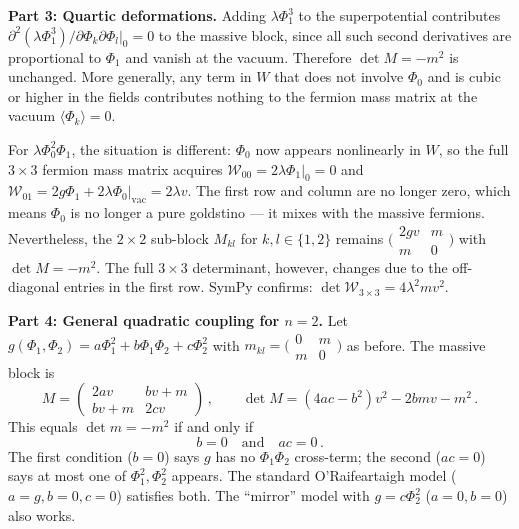\bigskip
\textbf{Part 3: Quartic deformations.}
Adding $\lambda\Phi_1^3$ to the superpotential contributes
$\partial^2(\lambda\Phi_1^3)/\partial\Phi_k\partial\Phi_l\big|_0 = 0$
to the massive block, since all such second derivatives are proportional to
$\Phi_1$ and vanish at the vacuum. Therefore $\det M = -m^2$ is unchanged.
More generally, any term in $W$ that does not involve $\Phi_0$ and is cubic
or higher in the fields contributes nothing to the fermion mass matrix at
the vacuum $\langle\Phi_k\rangle = 0$.

For $\lambda\Phi_0^2\Phi_1$, the situation is different: $\Phi_0$ now appears
nonlinearly in $W$, so the full $3\times 3$ fermion mass matrix acquires
$\mathcal{W}_{00} = 2\lambda\Phi_1\big|_0 = 0$ and
$\mathcal{W}_{01} = 2g\Phi_1 + 2\lambda\Phi_0\big|_{\mathrm{vac}} = 2\lambda v$.
The first row and column are no longer zero, which means $\Phi_0$ is no longer
a pure goldstino --- it mixes with the massive fermions. Nevertheless, the
$2\times 2$ sub-block $M_{kl}$ for $k,l \in \{1,2\}$ remains
$\bigl(\begin{smallmatrix} 2gv & m \\ m & 0 \end{smallmatrix}\bigr)$
with $\det M = -m^2$. The full $3\times 3$ determinant, however, changes due
to the off-diagonal entries in the first row. SymPy confirms:
$\det\mathcal{W}_{3\times 3} = 4\lambda^2 m v^2$.

\bigskip
\textbf{Part 4: General quadratic coupling for $n = 2$.}
Let $g(\Phi_1,\Phi_2) = a\Phi_1^2 + b\Phi_1\Phi_2 + c\Phi_2^2$ with
$m_{kl} = \bigl(\begin{smallmatrix} 0 & m \\ m & 0 \end{smallmatrix}\bigr)$ as before.
The massive block is
$$
M = \begin{pmatrix} 2av & bv + m \\ bv + m & 2cv \end{pmatrix}\,,
\qquad \det M = (4ac - b^2)v^2 - 2bmv - m^2\,.
$$
This equals $\det m = -m^2$ if and only if
$$
b = 0 \quad \text{and} \quad ac = 0\,.
$$
The first condition ($b = 0$) says $g$ has no $\Phi_1\Phi_2$ cross-term; the second
($ac = 0$) says at most one of $\Phi_1^2, \Phi_2^2$ appears.
The standard O'Raifeartaigh model ($a = g, b = 0, c = 0$) satisfies both.
The ``mirror'' model with $g = c\Phi_2^2$ ($a = 0, b = 0$) also works.

